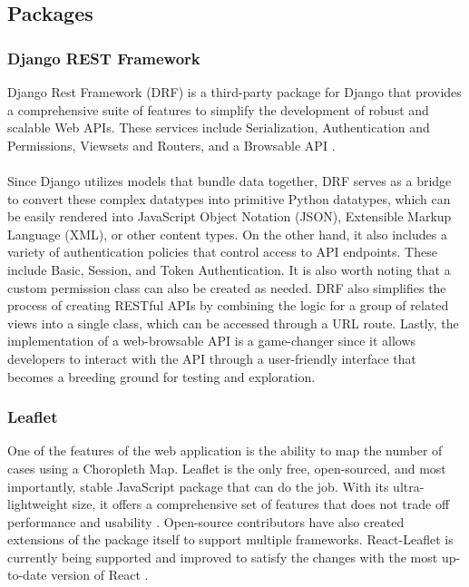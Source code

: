 \subsection{Packages}

\subsubsection{Django REST Framework}
Django Rest Framework (DRF) is a third-party package for Django that provides a comprehensive suite of features to simplify the development of robust and scalable Web APIs. These services include Serialization, Authentication and Permissions, Viewsets and Routers, and a Browsable API \cite{christie-no-date}. \\\\
Since Django utilizes models that bundle data together, DRF serves as a bridge to convert these complex datatypes into primitive Python datatypes, which can be easily rendered into JavaScript Object Notation (JSON), Extensible Markup Language (XML), or other content types. On the other hand, it also includes a variety of authentication policies that control access to API endpoints. These include Basic, Session, and Token Authentication. It is also worth noting that a custom permission class can also be created as needed. DRF also simplifies the process of creating RESTful APIs by combining the logic for a group of related views into a single class, which can be accessed through a URL route. Lastly, the implementation of a web-browsable API is a game-changer since it allows developers to interact with the API through a user-friendly interface that becomes a breeding ground for testing and exploration. 

\subsubsection{Leaflet}
One of the features of the web application is the ability to map the number of cases using a Choropleth Map. Leaflet is the only free, open-sourced, and most importantly, stable JavaScript package that can do the job. With its ultra-lightweight size, it offers a comprehensive set of features that does not trade off performance and usability \cite{leaflet-no-date}. Open-source contributors have also created extensions of the package itself to support multiple frameworks. React-Leaflet is currently being supported and improved to satisfy the changes with the most up-to-date version of React \cite{react-leaflet-no-date}. 

